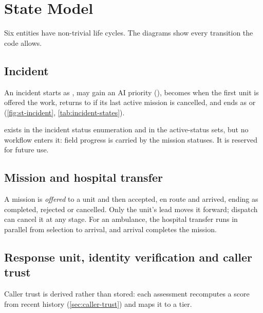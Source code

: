 
\section{State Model}

Six entities have non-trivial life cycles. The diagrams show every transition the code allows.

\subsection{Incident}
An incident starts as , may gain an AI priority (), becomes  when the first
unit is offered the work, returns to  if its last active mission is cancelled, and ends as
 or  (\cref{fig:st-incident}, \cref{tab:incident-states}).



\begin{caution}
 exists in the incident status enumeration and in the active-status sets, but no workflow enters it:
field progress is carried by the mission statuses. It is reserved for future use.
\end{caution}

\subsection{Mission and hospital transfer}
A mission is \emph{offered} to a unit and then accepted, en route and arrived, ending as completed, rejected or
cancelled. Only the unit's lead moves it forward; dispatch can cancel it at any stage. For an ambulance, the hospital
transfer runs in parallel from selection to arrival, and arrival completes the mission.


\subsection{Response unit, identity verification and caller trust}
Caller trust is derived rather than stored: each assessment recomputes a score from recent history
(\cref{sec:caller-trust}) and maps it to a tier.

